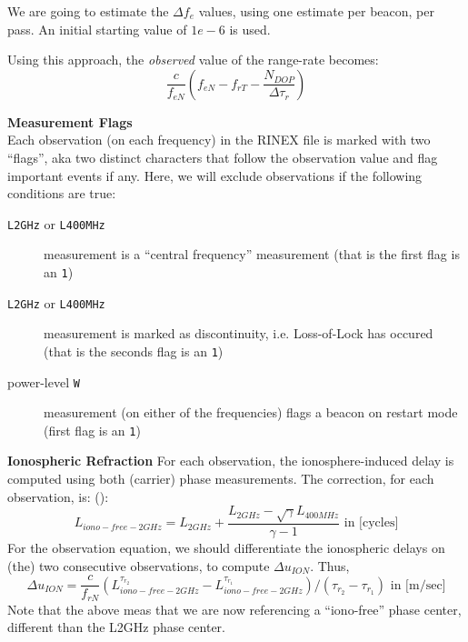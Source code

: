 We are going to estimate the $\Delta f_e$ values, using one estimate per beacon, 
per pass. An initial starting value of $1e-6$ is used.

Using this approach, the \emph{observed} value of the range-rate becomes:
\begin{equation}
  \frac{c}{f_{eN}} \left( f_{eN} - f_{rT} - \frac{N_{DOP}}{\Delta \tau_{r}} \right) 
\end{equation}

\textbf{Measurement Flags}\\
\label{measurement-flags}
Each observation (on each frequency) in the RINEX file is marked with two ``flags'', 
aka two distinct characters that follow the observation value and flag important 
events if any. Here, we will exclude observations if the following conditions are true:
\begin{description}
  \item[\texttt{L2GHz} or \texttt{L400MHz}] measurement is a ``central frequency'' 
  measurement (that is the first flag is an \texttt{1})
  \item[\texttt{L2GHz} or \texttt{L400MHz}] measurement is marked as discontinuity, 
  i.e. Loss-of-Lock has occured (that is the seconds flag is an \texttt{1})
  \item[power-level \texttt{W}] measurement (on either of the frequencies) flags 
  a beacon on restart mode (first flag is an \texttt{1})
\end{description}

\textbf{Ionospheric Refraction}
\label{ionospheric-refraction}
For each observation, the ionosphere-induced delay is computed using both 
(carrier) phase measurements. The correction, for each observation, is: 
(\cite{lemoine-2016}):
\begin{equation}
  L_{iono-free-2GHz} = L_{2GHz} 
    + \frac{L_{2GHz} - \sqrt \gamma L_{400MHz}}{\gamma - 1} 
    \text{ in [cycles]}
\end{equation}
For the observation equation, we should differentiate the ionospheric delays on 
(the) two consecutive observations, to compute $\Delta u_{ION}$. Thus,
\begin{equation}
  \Delta u_{ION} = \frac{c}{f_{rN}} \left( L_{iono-free-2GHz}^{\tau_{r_2}} 
    - L_{iono-free-2GHz}^{\tau_{r_1}} \right) / (\tau_{r_2} - \tau_{r_1})
    \text{ in [m/sec]}
\end{equation}
Note that the above meas that we are now referencing a ``iono-free'' phase center, 
different than the L2GHz phase center.

